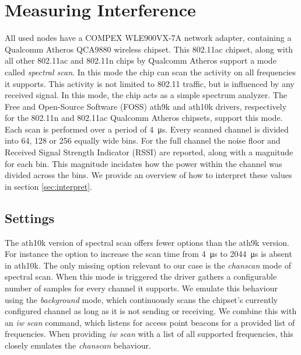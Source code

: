\documentclass[a4paper, 11pt]{article}
\begin{document}
\section{Measuring Interference}
All used nodes have a COMPEX WLE900VX-7A network adapter, containing a Qualcomm Atheros QCA9880 wireless chipset. This 802.11ac chipset, along with all other 802.11ac and 802.11n chips by Qualcomm Atheros support a mode called \textit{spectral scan}. In this mode the chip can scan the activity on all frequencies it supports. This activity is not limited to 802.11 traffic, but is influenced by any received signal. In this mode, the chip acts as a simple spectrum analyzer. The Free and Open-Source Software (FOSS) ath9k and ath10k drivers, respectively for the 802.11n and 802.11ac Qualcomm Atheros chipsets, support this mode. Each scan is performed over a period of \SI{4}{\micro\second}. Every scanned channel is divided into 64, 128 or 256 equally wide bins. For the full channel the noise floor and Received Signal Strength Indicator (RSSI) are reported, along with a magnitude for each bin. This magnitude incidates  how the power within the channel was divided across the bins. We provide an overview of how to interpret these values in section \ref{sec:interpret}. \\
\subsection{Settings}
The ath10k version of spectral scan offers fewer options than the ath9k version. For instance the option to increase the scan time from \SI{4}{\micro\second} to \SI{2044}{\micro\second} is absent in ath10k. The only missing option relevant to our case is the \textit{chanscan} mode of spectral scan. When this mode is triggered the driver gathers a configurable number of samples for every channel it supports. We emulate this behaviour using the \textit{background} mode, which continuously scans the chipset's currently configured channel as long as it is not sending or receiving. We combine this with an \textit{iw scan} command, which listens for access point beacons for a provided list of frequencies. When providing \textit{iw scan} with a list of all supported frequencies, this closely emulates the \textit{chanscan} behaviour.
\end{document}
